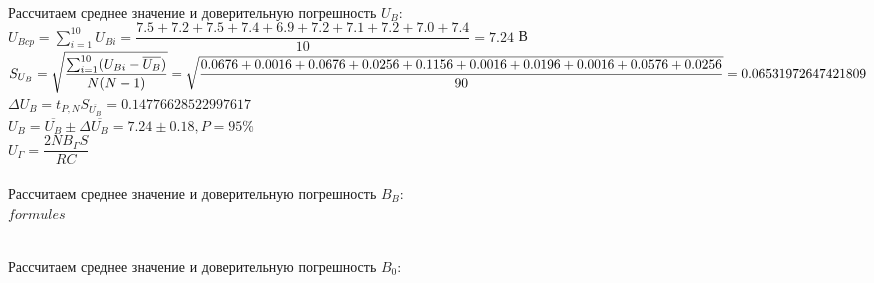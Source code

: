 \ \\ 

Рассчитаем среднее значение и доверительную погрешность $ U_B $:\\

$ U_{Bcp} = \sum_{i=1}^{10} U_{Bi} = \dfrac{7.5 + 7.2 + 7.5 + 7.4 + 6.9 + 7.2 + 7.1 + 7.2 + 7.0 + 7.4}{10} = 7.24 $ В
\\

$
S_{U_B} = \sqrt{
	\dfrac
	{
		\sum_{i=1}^{10}(U_{Bi} - \overline{U_B})
	}
	{
		N(N-1)
	}
}
=\\ \sqrt{
	\dfrac
	{
		0.0676 + 0.0016 + 0.0676 + 0.0256 + 0.1156 + 0.0016 + 0.0196 + 0.0016 + 0.0576 + 0.0256
	}
	{
		90
	}
}
=\\
0.06531972647421809
$
\\

$ \varDelta U_B = t_{P,N}S_{\overline{U_B}} =  0.14776628522997617 $
\\

$ U_B = \overline{U_B} \pm \varDelta \overline{U_B} = 7.24 \pm 0.18, P = 95\%$
\\

$ U_\Gamma = \dfrac{2NB_\Gamma S}{RC} $
\\

\ \\ 

Рассчитаем среднее значение и доверительную погрешность $ B_B $:\\

$ formules $

\ \\ 

Рассчитаем среднее значение и доверительную погрешность $ B_0 $:\\


